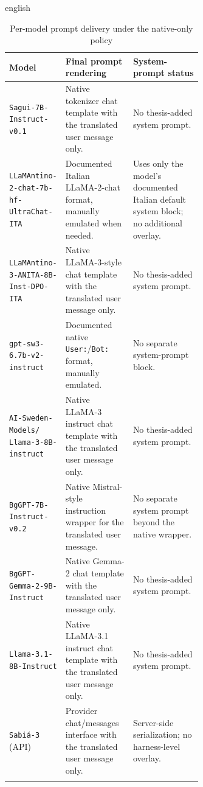 \begin{otherlanguage*}{english}
\begin{table}[htbp]
\centering
\footnotesize
\setlength\extrarowheight{2pt}
\begin{tabularx}{\linewidth}{>{\raggedright\arraybackslash}p{0.28\linewidth}|>{\raggedright\arraybackslash}p{0.35\linewidth}|>{\raggedright\arraybackslash}X}
\caption[Per-model prompt delivery policy]{Per-model prompt delivery under the native-only policy}
\label{tab:prompt-format-policy} \\
\hline
\textbf{Model} & \textbf{Final prompt rendering} & \textbf{System-prompt status} \\
\hline
\texttt{Sagui-7B-Instruct-v0.1} & Native tokenizer chat template with the translated user message only. & No thesis-added system prompt. \\
\hline
\makecell[l]{\texttt{LLaMAntino-2-chat-7b-hf-}\\\texttt{UltraChat-ITA}} & Documented Italian LLaMA-2-chat format, manually emulated when needed. & Uses only the model's documented Italian default system block; no additional overlay. \\
\hline
\makecell[l]{\texttt{LLaMAntino-3-ANITA-8B-}\\\texttt{Inst-DPO-ITA}} & Native LLaMA-3-style chat template with the translated user message only. & No thesis-added system prompt. \\
\hline
\texttt{gpt-sw3-6.7b-v2-instruct} & Documented native \texttt{User:}/\texttt{Bot:} format, manually emulated. & No separate system-prompt block. \\
\hline
\makecell[l]{\texttt{AI-Sweden-Models/}\\\texttt{Llama-3-8B-instruct}} & Native LLaMA-3 instruct chat template with the translated user message only. & No thesis-added system prompt. \\
\hline
\texttt{BgGPT-7B-Instruct-v0.2} & Native Mistral-style instruction wrapper for the translated user message. & No separate system prompt beyond the native wrapper. \\
\hline
\texttt{BgGPT-Gemma-2-9B-Instruct} & Native Gemma-2 chat template with the translated user message only. & No thesis-added system prompt. \\
\hline
\texttt{Llama-3.1-8B-Instruct} & Native LLaMA-3.1 instruct chat template with the translated user message only. & No thesis-added system prompt. \\
\hline
\texttt{Sabi\'a-3} (API) & Provider chat/messages interface with the translated user message only. & Server-side serialization; no harness-level overlay. \\
\hline
\multicolumn{3}{p{\dimexpr\linewidth-2\tabcolsep\relax}}{\fonte{Author.}} \\
\end{tabularx}
\end{table}


\end{otherlanguage*}
